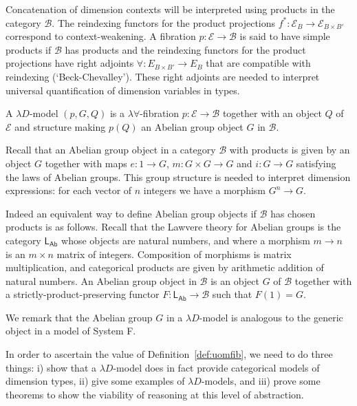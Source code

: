 \documentclass[a4paper,UKenglish]{lipics}
\newcommand{\msf}[1]{\mathsf{#1}} %
\newcommand{\LAb}{\msf{L}_{\msf{Ab}}}
\newcommand{\B}{\mathcal{B}}
\newcommand{\E}{\mathcal{E}}
\begin{document}
Concatenation of dimension contexts will be interpreted using
products in the category $\B$.
The reindexing functors for the product projections $f^*:\E_{B}\to \E_{B\times B'}$
correspond to context-weakening.
A fibration $p:\E\to \B$ is said to have simple products if $\B$ has products and
the reindexing functors for the product projections have right adjoints
$\forall:E_{B\times B'}\to E_B$
that are compatible with reindexing (`Beck-Chevalley').
These right adjoints
are needed to interpret universal quantification of dimension variables in types.

\begin{definition}
A $\lambda D$-model $(p,G, Q)$ is a $\lambda \forall$-fibration $p:\E\to \B$
together with an object $Q$ of $\E$ and
structure making $p(Q)$ an Abelian group object $G$ in $\B$.
\end{definition}
Recall that an Abelian group object in a category $\B$ with products
is given by an object
$G$ together with maps $e:1\to G$, $m:G\times G\to G$ and
$i:G\to G$ satisfying the laws of Abelian groups.
This group structure is needed to interpret dimension expressions:
for each vector of $n$ integers we have
a morphism $G^n\to G$.

Indeed an equivalent way to define Abelian group objects if $\B$ has chosen products is as follows. Recall that the Lawvere theory for Abelian groups is the category $\LAb$ whose objects are natural numbers, and where a morphism $m\to n$ is an $m\times n$ matrix of integers. Composition of morphisms is matrix multiplication, and categorical products are given by arithmetic addition of natural numbers. An Abelian group object in $\B$ is an object $G$ of $\B$ together with a strictly-product-preserving functor $F:\LAb\to\B$ such that $F(1)=G$.


We remark that the Abelian group $G$ in a $\lambda D$-model is analogous to the generic object in a model of System F.

In order to ascertain the value of Definition~\ref{def:uomfib}, we
need to do three things: i) show that a $\lambda D$-model does in fact provide categorical models of dimension types, ii) give some examples of $\lambda D$-models, and iii) prove some theorems to show the viability of reasoning at this level of abstraction.\\
\end{document}
